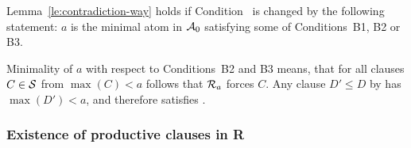 \begin{COROLLARY} \label{cor:contradiction-way}
Lemma~\ref {le:contradiction-way} holds if Condition~ is changed by the
following  statement:  $a$ is the minimal atom in \(\mbox{$\cal A$}_0\) satisfying
some of Conditions~B1, B2 or B3. 
\end{COROLLARY}
\begin{PROOF}
Minimality of $a$ with respect to Conditions~B2 and B3 means, that  for all clauses
$C\in\mbox{$\cal S$}$ from \(\max(C)<a\) follows that \(\mbox{$\cal R$}_a\) forces $C$. Any clause
\(D'\leq D\) by  has \(\max(D')<a\), and therefore satisfies .
\end{PROOF}

\subsubsection{Existence of productive clauses in \protect\C R}

